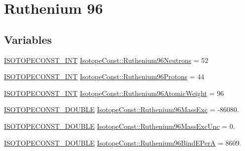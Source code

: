 \hypertarget{group___isotope_const-_ruthenium-_ru96}{}\section{Ruthenium 96}
\label{group___isotope_const-_ruthenium-_ru96}
\subsection*{Variables}
\begin{DoxyCompactItemize}
\item 
\mbox{\hyperlink{group___isotope_const-_macros_ga5f18360b3e99483a35c32d789e62621c}{I\+S\+O\+T\+O\+P\+E\+C\+O\+N\+S\+T\+\_\+\+I\+NT}} \mbox{\hyperlink{group___isotope_const-_ruthenium-_ru96_ga615cb12ba0bc3cd988f0c8ddd8f42e9f}{Isotope\+Const\+::\+Ruthenium96\+Neutrons}} = 52
\item 
\mbox{\hyperlink{group___isotope_const-_macros_ga5f18360b3e99483a35c32d789e62621c}{I\+S\+O\+T\+O\+P\+E\+C\+O\+N\+S\+T\+\_\+\+I\+NT}} \mbox{\hyperlink{group___isotope_const-_ruthenium-_ru96_ga3334ea3437167e1575d12156c5dc5518}{Isotope\+Const\+::\+Ruthenium96\+Protons}} = 44
\item 
\mbox{\hyperlink{group___isotope_const-_macros_ga5f18360b3e99483a35c32d789e62621c}{I\+S\+O\+T\+O\+P\+E\+C\+O\+N\+S\+T\+\_\+\+I\+NT}} \mbox{\hyperlink{group___isotope_const-_ruthenium-_ru96_gafa74aa39836f7bcd86b5c99c530d13aa}{Isotope\+Const\+::\+Ruthenium96\+Atomic\+Weight}} = 96
\item 
\mbox{\hyperlink{group___isotope_const-_macros_ga8f45a7272ce02c0b4c65c44636ed719a}{I\+S\+O\+T\+O\+P\+E\+C\+O\+N\+S\+T\+\_\+\+D\+O\+U\+B\+LE}} \mbox{\hyperlink{group___isotope_const-_ruthenium-_ru96_ga28a898d826f46d072228e6300341c76d}{Isotope\+Const\+::\+Ruthenium96\+Mass\+Exc}} = -\/86080.
\item 
\mbox{\hyperlink{group___isotope_const-_macros_ga8f45a7272ce02c0b4c65c44636ed719a}{I\+S\+O\+T\+O\+P\+E\+C\+O\+N\+S\+T\+\_\+\+D\+O\+U\+B\+LE}} \mbox{\hyperlink{group___isotope_const-_ruthenium-_ru96_ga24c8a4af4449d60a7e2aa68e999b5202}{Isotope\+Const\+::\+Ruthenium96\+Mass\+Exc\+Unc}} = 0.
\item 
\mbox{\hyperlink{group___isotope_const-_macros_ga8f45a7272ce02c0b4c65c44636ed719a}{I\+S\+O\+T\+O\+P\+E\+C\+O\+N\+S\+T\+\_\+\+D\+O\+U\+B\+LE}} \mbox{\hyperlink{group___isotope_const-_ruthenium-_ru96_gaee7eb7ff60aff64c88b109464275b25e}{Isotope\+Const\+::\+Ruthenium96\+Bind\+E\+PerA}} = 8609.
\item 

\end{DoxyCompactItemize}
